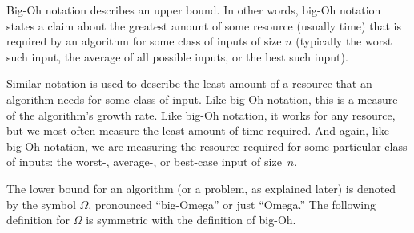Big-Oh notation describes an upper bound.
In other words, big-Oh notation states a claim about the greatest
amount of some resource (usually time) that is required by an
algorithm for some class of inputs of size \(n\) (typically
the worst such input, the average of all possible inputs, or the best
such input).

Similar notation is used to describe the least amount of a resource
that an algorithm needs for some class of input.
Like big-Oh notation, this is a measure of the algorithm's
growth rate.
Like big-Oh notation, it works for any resource, but
we most often measure the least amount of time required.
And again, like big-Oh notation, we are measuring the resource
required for some particular class of inputs: the worst-, average-,
or best-case input of size~\(n\).

The lower bound for an algorithm (or a problem, as explained later)
is denoted by the symbol \(\Omega\), pronounced ``big-Omega'' or just
``Omega.''
The following definition for \(\Omega\) is symmetric with the
definition of big-Oh.

